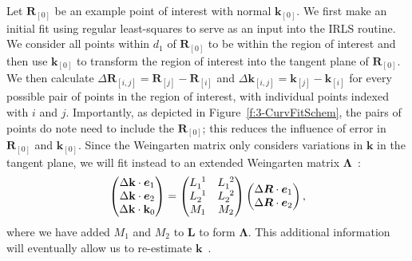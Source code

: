 Let $\mathbf{R}_{[0]}$ be an example point of interest with normal $\mathbf{k}_{[0]}$.
We first make an initial fit using regular least-squares to serve as an input into the IRLS routine.
We consider all points within $d_1$ of $\mathbf{R}_{[0]}$ to be within the region of interest and then use $\mathbf{k}_{[0]}$ to transform the region of interest into the tangent plane of $\mathbf{R}_{[0]}$.
We then calculate $\Delta \mathbf{R}_{[i,j]} = \mathbf{R}_{[j]}-\mathbf{R}_{[i]}$ and $\Delta \mathbf{k}_{[i,j]} = \mathbf{k}_{[j]}-\mathbf{k}_{[i]}$ for every possible pair of points in the region of interest, with individual points indexed with $i$ and $j$.
Importantly, as depicted in Figure~\ref{f:3-CurvFitSchem}, the pairs of points do note need to include the $\mathbf{R}_{[0]}$; this reduces the influence of error in $\mathbf{R}_{[0]}$ and $\mathbf{k}_{[0]}$.
Since the Weingarten matrix only considers variations in $\mathbf{k}$ in the tangent plane, we will fit instead to an extended Weingarten matrix $\bm{\Lambda}$~\cite{RN31,RN32}:
\begin{equation}
\begin{pmatrix}
\Delta \mathbf{k} \cdot \bm{e}_1 \\
\Delta \mathbf{k} \cdot \bm{e}_2 \\
\Delta \mathbf{k} \cdot \mathbf{k}_0
\end{pmatrix}
=
\begin{pmatrix}
\tensor{L}{_1^1} & \tensor{L}{_1^2} \\
\tensor{L}{_2^1} & \tensor{L}{_2^2} \\
M_{1} & M_{2}
\end{pmatrix}
\begin{pmatrix}
\Delta \bm{R} \cdot \bm{e}_1 \\
\Delta \bm{R} \cdot \bm{e}_2
\end{pmatrix},
\label{e:3-Kfit2}
\end{equation}
where we have added $M_1$ and $M_2$ to $\mathbf{L}$ to form $\bm{\Lambda}$.
This additional information will eventually allow us to re-estimate $\mathbf{k}$~\cite{RN31}.
